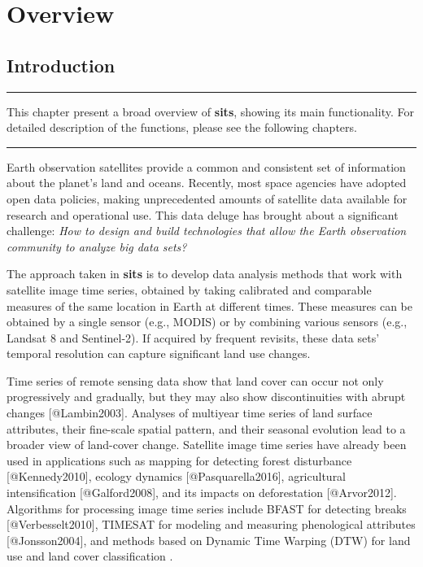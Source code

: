 \documentclass[a4paper,]{tufte-book}
\begin{document}
\hypertarget{part-overview}{%
\part{Overview}\label{part-overview}}

\hypertarget{introduction}{%
\chapter{Introduction}\label{introduction}}

\begin{center}\rule{0.5\linewidth}{0.5pt}\end{center}

This chapter present a broad overview of \textbf{sits}, showing its main functionality. For detailed description of the functions, please see the following chapters.

\begin{center}\rule{0.5\linewidth}{0.5pt}\end{center}

Earth observation satellites provide a common and consistent set of information about the planet's land and oceans. Recently, most space agencies have adopted open data policies, making unprecedented amounts of satellite data available for research and operational use. This data deluge has brought about a significant challenge: \emph{How to design and build technologies that allow the Earth observation community to analyze big data sets?}

The approach taken in \textbf{sits} is to develop data analysis methods that work with satellite image time series, obtained by taking calibrated and comparable measures of the same location in Earth at different times. These measures can be obtained by a single sensor (e.g., MODIS) or by combining various sensors (e.g., Landsat 8 and Sentinel-2). If acquired by frequent revisits, these data sets' temporal resolution can capture significant land use changes.

Time series of remote sensing data show that land cover can occur not only progressively and gradually, but they may also show discontinuities with abrupt changes [@Lambin2003]. Analyses of multiyear time series of land surface attributes, their fine-scale spatial pattern, and their seasonal evolution lead to a broader view of land-cover change. Satellite image time series have already been used in applications such as mapping for detecting forest disturbance [@Kennedy2010], ecology dynamics [@Pasquarella2016], agricultural intensification [@Galford2008], and its impacts on deforestation [@Arvor2012]. Algorithms for processing image time series include BFAST for detecting breaks [@Verbesselt2010], TIMESAT for modeling and measuring phenological attributes [@Jonsson2004], and methods based on Dynamic Time Warping (DTW) for land use and land cover classification \citep{Petitjean2012}\citep{Maus2016}.
\end{document}
